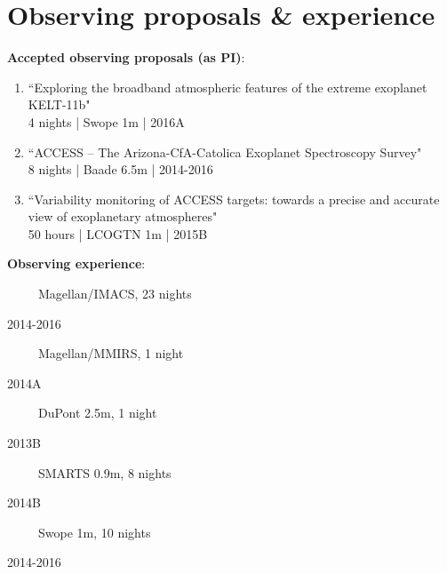 \documentclass[11pt, a4paper]{article} %
\begin{document}
\section*{Observing proposals \& experience}
\begin{flushleft}%
  \setlength{\leftskip}{0.2cm}%
\textbf{Accepted observing proposals (as PI)}:
\begin{enumerate}
\item ``Exploring the broadband atmospheric features of the extreme exoplanet KELT-11b"\\
         4 nights | Swope 1m | 2016A
\item ``ACCESS -- The Arizona-CfA-Catolica Exoplanet Spectroscopy Survey"\\
         8 nights | Baade 6.5m | 2014-2016
\item ``Variability monitoring of ACCESS targets: towards a precise and accurate view of exoplanetary atmospheres"\\
         50 hours | LCOGTN 1m | 2015B
\end{enumerate}
\textbf{Observing experience}:
\end{flushleft}

\begin{minipage}[t]{0.7\textwidth}
\ \ \ \ \ Magellan/IMACS, 23 nights 
\end{minipage}
\begin{minipage}[t]{0.3\textwidth}
\hfill 2014-2016
\end{minipage}
\begin{minipage}[t]{0.7\textwidth}
\ \ \ \ \ Magellan/MMIRS, 1 night
\end{minipage}
\begin{minipage}[t]{0.3\textwidth}
\hfill 2014A
\end{minipage}

\begin{minipage}[t]{0.7\textwidth}
\ \ \ \ \ DuPont 2.5m, 1 night
\end{minipage}
\begin{minipage}[t]{0.3\textwidth}
\hfill 2013B
\end{minipage}

\begin{minipage}[t]{0.7\textwidth}
\ \ \ \ \ SMARTS 0.9m, 8 nights
\end{minipage}
\begin{minipage}[t]{0.3\textwidth}
\hfill 2014B
\end{minipage}

\begin{minipage}[t]{0.7\textwidth}
\ \ \ \ \ Swope 1m, 10 nights
\end{minipage}
\begin{minipage}[t]{0.3\textwidth}
\hfill 2014-2016
\end{minipage}
\end{document}

